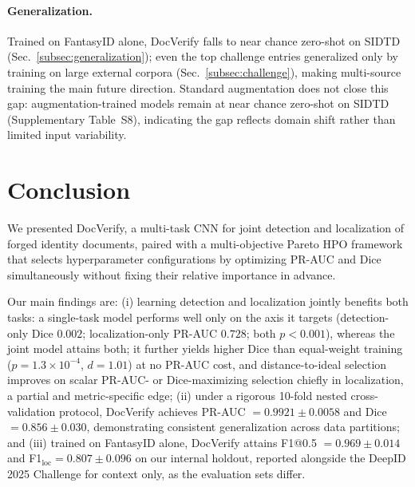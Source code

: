 \documentclass[final,5p,times,twocolumn,number]{elsarticle}
\newcommand{\rev}[1]{#1}
\newcommand{\revB}[1]{#1}
\begin{document}
\paragraph{\rev{Generalization.}}
\rev{Trained on FantasyID alone, DocVerify falls to near chance zero-shot on SIDTD
(Sec.~\ref{subsec:generalization}); even the top challenge entries generalized
only by training on large external corpora (Sec.~\ref{subsec:challenge}), making
multi-source training the main future direction.} \revB{Standard augmentation does
not close this gap: augmentation-trained models remain at near chance zero-shot on
SIDTD (Supplementary Table~S8), indicating the gap reflects domain shift rather
than limited input variability.}


\section{Conclusion}
\label{sec:conclusion}

We presented DocVerify, a multi-task CNN for joint detection and localization of
forged identity documents, paired with a multi-objective Pareto HPO framework
that selects hyperparameter configurations by optimizing PR-AUC and Dice
simultaneously without fixing their relative importance in advance.

Our main findings are: \rev{(i) learning detection and localization jointly
benefits both tasks: a single-task model performs well only on the axis it
targets (detection-only Dice $0.002$; localization-only PR-AUC $0.728$; both
$p < 0.001$), whereas the joint model attains both; it further yields higher
Dice than equal-weight training ($p = 1.3 \times 10^{-4}$, $d = 1.01$) at no
PR-AUC cost,} \revB{and distance-to-ideal selection improves on scalar PR-AUC- or
Dice-maximizing selection chiefly in localization, a partial and metric-specific
edge}; (ii) under a rigorous 10-fold
nested cross-validation protocol, DocVerify achieves PR-AUC $= 0.9921 \pm
0.0058$ and Dice $= 0.856 \pm 0.030$, demonstrating consistent generalization
across data partitions; and \rev{(iii) trained on FantasyID alone, DocVerify
attains F1@0.5 $= 0.969 \pm 0.014$ and F1$_{\text{loc}} = 0.807 \pm 0.096$ on our
internal holdout, reported alongside the DeepID 2025 Challenge for context only,
as the evaluation sets differ.}
\end{document}
